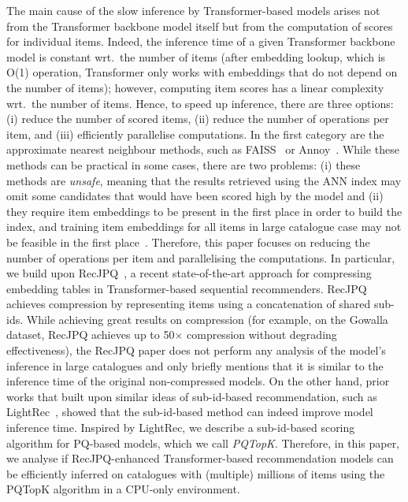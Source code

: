 \documentclass[sigconf,natbib=true, review=true]{acmart} %
\newcommand{\pageenlarge}[1]{\marginnote{#1}\enlargethispage{#1\baselineskip}}
\newcommand{\rsasha}[1]{\textcolor[HTML]{FF0000}{#1}}
\begin{document}
\pageenlarge{3}
 The main cause of the slow inference by Transformer-based models arises not from the Transformer backbone model itself but from the computation of scores for individual items. Indeed, the inference time of a given Transformer backbone model is constant wrt.\ the number of items \rsasha{(after embedding lookup, which is O(1) operation, Transformer only works with embeddings that do not depend on the number of items)}; however, computing item scores has a linear complexity wrt.\ the number of items. Hence, to speed up inference, there are three options: (i) reduce the number of scored items, (ii) reduce the number of operations per item, and (iii) efficiently parallelise computations. 
%
In the first category are the approximate nearest neighbour methods, such as FAISS~\cite{FAISS} or Annoy~\cite{SpotifyAnnoy2024}. While these methods can be practical in some cases, there are two problems: (i) these methods are \emph{unsafe}, meaning that the results retrieved using the ANN index may omit some candidates that would have been scored high by the model and (ii) they require item embeddings to be present in the first place in order to build the index, and training item embeddings for all items in large catalogue case may not be feasible in the first place~\cite{petrovRecJPQTrainingLargeCatalogue2024}.
%
Therefore, this paper focuses on reducing the number of operations per item and parallelising the computations. In particular, we build upon RecJPQ~\cite{petrovRecJPQTrainingLargeCatalogue2024}, a recent state-of-the-art approach for compressing embedding tables in Transformer-based sequential recommenders. RecJPQ achieves compression by representing items using a concatenation of shared sub-ids. While achieving great results on compression (for example, on the Gowalla~\cite{choFriendshipMobilityUser2011} dataset, RecJPQ achieves up to 50$\times$ compression without degrading effectiveness), the RecJPQ paper does not perform any analysis of the model's inference in large catalogues and only briefly mentions that it is similar to the inference time of the original non-compressed models. On the other hand, prior works that built upon similar ideas of sub-id-based recommendation, such as LightRec~\cite{lianLightRecMemorySearchEfficient2020}, showed that the sub-id-based method can indeed improve model inference time. \rsasha{Inspired by LightRec, we describe a sub-id-based scoring algorithm for PQ-based models, which we call \textit{PQTopK}.} Therefore, in this paper, we analyse 
if RecJPQ-enhanced Transformer-based recommendation models can be efficiently inferred on catalogues with (multiple) millions of items using the PQTopK algorithm in a CPU-only environment. 
\end{document}
